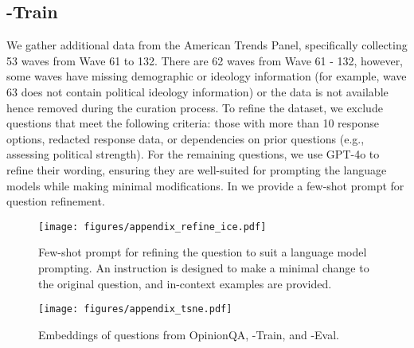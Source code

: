 \subsection{\OURDATA-Train}
\label{appendix_ourdata_atp}
We gather additional data from the American Trends Panel, specifically collecting 53 waves from Wave 61 to 132.
There are 62 waves from Wave 61 - 132, however, some waves have missing demographic or ideology information (for example, wave 63 does not contain political ideology information) or the data is not available hence removed during the curation process.
To refine the dataset, we exclude questions that meet the following criteria:
those with more than 10 response options, redacted response data, or dependencies on prior questions (e.g., assessing political strength). 
For the remaining questions, we use GPT-4o to refine their wording, ensuring they are well-suited for prompting the language models while making minimal modifications.
In  we provide a few-shot prompt for question refinement.

\begin{figure}[ht]
    \captionsetup{font=small}
    \texttt{[image: figures/appendix\_refine\_ice.pdf]}
    \vspace{-15pt}
    \caption{
    Few-shot prompt for refining the question to suit a language model prompting. An instruction is designed to make a minimal change to the original question, and in-context examples are provided.
    }
    \label{fig:question_refine_ice}
    \vspace{-5pt}
\end{figure}

\begin{figure}
    \centering
    \captionsetup{font=small}
    \texttt{[image: figures/appendix\_tsne.pdf]}
    \caption{Embeddings of questions from OpinionQA, \OURDATA-Train, and \OURDATA-Eval.}
    \label{fig:question-embs}
\end{figure}

